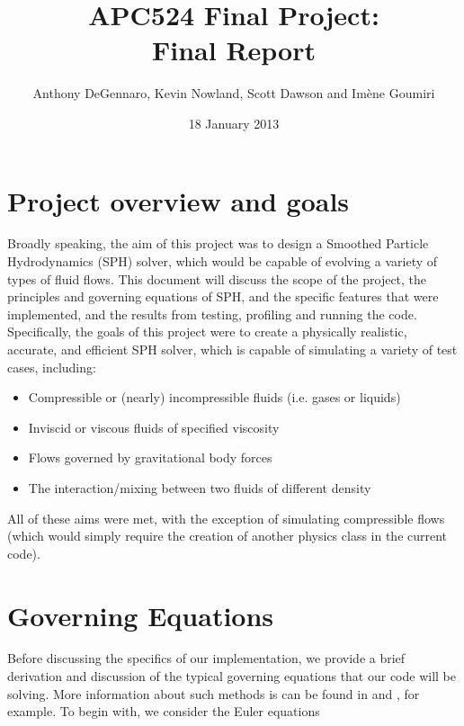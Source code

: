\documentclass[11pt]{article}
\begin{document}


\title{\textbf{\Large APC524 Final Project:} \\ Final Report}
\author{Anthony DeGennaro, Kevin Nowland, Scott Dawson and Im\`ene Goumiri}
\date{18 January 2013}
\maketitle

\section{Project overview and goals}

Broadly speaking, the aim of this project was to design a Smoothed Particle Hydrodynamics (SPH) solver, which would be capable of evolving a variety of types of fluid flows. This document will discuss the scope of the project, the principles and governing equations of SPH, and the specific features that were implemented, and the results from testing, profiling and running the code. Specifically, the goals of this project were to create a physically realistic, accurate, and efficient SPH solver, which is capable of simulating a variety of test cases, including:
\begin{itemize}
\item Compressible or (nearly) incompressible fluids (i.e. gases or liquids)
\item Inviscid or viscous fluids of specified viscosity
\item Flows governed by gravitational body forces
\item The interaction/mixing between two fluids of different density
\end{itemize}
All of these aims were met, with the exception of simulating compressible flows (which would simply require the creation of another physics class in the current code). 

\section{Governing Equations}
Before discussing the specifics of our implementation, we provide a brief derivation and discussion of the typical governing equations that our code will be solving. More information about such methods is can be found in \cite{Mon92} and \cite{Mon05}, for example. To begin with, we consider the Euler equations
\end{document}
